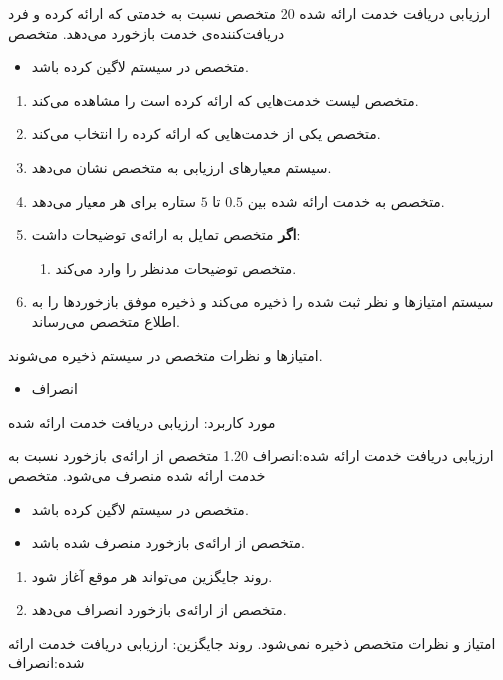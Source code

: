 {
\usecase
{
	ارزیابی دریافت خدمت ارائه شده
}
{20}
{
	متخصص نسبت به خدمتی که ارائه کرده و فرد دریافت‌کننده‌ی خدمت بازخورد می‌دهد.
}
{
	متخصص
}
{}
{
	\begin{itemize}
		\vspace*{-0.6cm}
		\item 
		متخصص در سیستم لاگین کرده باشد.
	\end{itemize}
}
{
	\vspace*{-0.6cm}
	\begin{enumerate}
		\item 
		متخصص لیست خدمت‌هایی که ارائه کرده است را مشاهده می‌کند.
		\item
		متخصص یکی از خدمت‌هایی که ارائه کرده را انتخاب می‌کند.

\item
سیستم معیارهای ارزیابی  به متخصص نشان می‌دهد.
\item 
متخصص به خدمت ارائه شده بین $0.5$ تا $5$ ستاره برای هر معیار می‌دهد.

\item 
\textbf{اگر} متخصص تمایل به ارائه‌ی توضیحات داشت:
\begin{enumerate}[label=\theenumi.\arabic*.]
	\item 
	متخصص توضیحات مدنظر را وارد می‌کند. 
\end{enumerate}
\item
سیستم امتیازها و نظر ثبت شده را ذخیره می‌کند و ذخیره موفق بازخوردها را به اطلاع متخصص می‌رساند.

	\end{enumerate}
}
{
	امتیازها و نظرات متخصص در سیستم ذخیره می‌شوند.
}
{
	\begin{itemize}
		\vspace*{-0.6cm}
		\item 
		انصراف
	\end{itemize}
}
{
	مورد کاربرد: ارزیابی دریافت خدمت ارائه شده
}




\alternativeflow
{
	ارزیابی دریافت خدمت ارائه شده:انصراف
}
{1.20}
{
	متخصص از ارائه‌ی بازخورد نسبت به خدمت ارائه شده منصرف می‌شود.
}
{
	متخصص
}
{}
{
	\begin{itemize}
		\vspace*{-0.6cm}
		\item 
		متخصص در سیستم لاگین کرده باشد.
		\item
		متخصص از ارائه‌ی بازخورد منصرف شده باشد.
	\end{itemize}
}
{
	\vspace*{-0.6cm}
	\begin{enumerate}
		\item 
		روند جایگزین می‌تواند هر موقع آغاز شود.
		\item
		متخصص از ارائه‌ی بازخورد انصراف می‌دهد.
	\end{enumerate}
}
{
	امتیاز و نظرات متخصص ذخیره نمی‌شود.
}
{
	روند جایگزین: ارزیابی دریافت خدمت ارائه شده:انصراف
}
}



